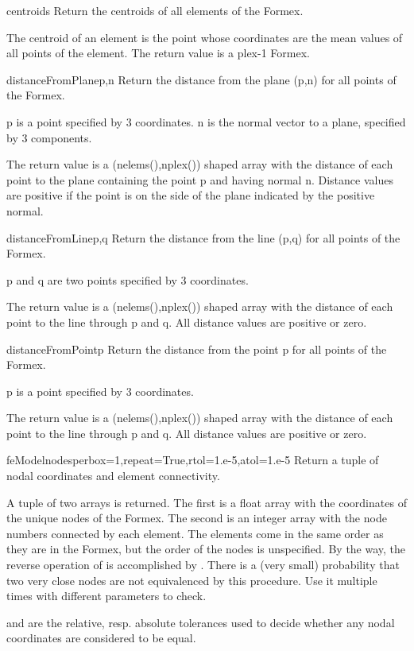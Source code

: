 \begin{methoddesc}{centroids}{}
        Return the centroids of all elements of the Formex.

        The centroid of an element is the point whose coordinates
        are the mean values of all points of the element.
        The return value is a plex-1 Formex.
\end{methoddesc}


\begin{methoddesc}{distanceFromPlane}{p,n}
    Return the distance from the plane (p,n) for all points of the Formex.

    p is a point specified by 3 coordinates.
    n is the normal vector to a plane, specified by 3 components.

    The return value is a (nelems(),nplex()) shaped array with the distance of
    each point to the plane containing the point  p and having normal n.
    Distance values are positive if the point is on the side of the
    plane indicated by the positive normal.
\end{methoddesc}


\begin{methoddesc}{distanceFromLine}{p,q}
    Return the distance from the line (p,q) for all points of the Formex.

    p and q are two points specified by 3 coordinates.

    The return value is a (nelems(),nplex()) shaped array with the distance of
    each point to the line through p and q.
    All distance values are positive or zero.
\end{methoddesc}


\begin{methoddesc}{distanceFromPoint}{p}
    Return the distance from the point p for all points of the Formex.

    p is a point specified by 3 coordinates.

    The return value is a (nelems(),nplex()) shaped array with the distance of
    each point to the line through p and q.
    All distance values are positive or zero.
\end{methoddesc}


\begin{methoddesc}{feModel}{nodesperbox=1,repeat=True,rtol=1.e-5,atol=1.e-5}
Return a tuple of nodal coordinates and element connectivity.

A tuple of two arrays is returned. The first is a float array with the coordinates of the unique nodes of the Formex. The second is an integer array with the node numbers connected by each element. The elements come in the same order as they are in the Formex, but the order of the nodes is unspecified. By the way, the reverse operation of
 is accomplished by . There is a (very small) probability that two very close nodes are not equivalenced by this procedure. Use it multiple times with different parameters to check.

 and  are the relative, resp. absolute tolerances used to decide whether any nodal coordinates are considered to be equal. 
\end{methoddesc}


